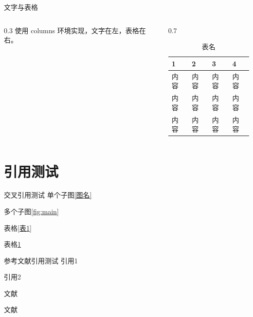 \documentclass[11pt, aspectratio=169, UTF8, fontset=none]{ctexbeamer}
\begin{document}
\begin{frame}{文字与表格}
    \begin{columns}
        \begin{column}{0.3\textwidth}
            使用 columns 环境实现，文字在左，表格在右。
        \end{column}

        \begin{column}{0.7\textwidth}
            \begin{table}[htbp]%
                \caption{表名}\label{表2}
                \centering
                \begin{tabular}{p{1.5cm}<{\centering} p{1.5cm}<{\centering} p{1.5cm}<{\centering} p{1.5cm}<{\centering}}%
                    \toprule[1.5pt]
                    1  & 2  & 3  & 4  \\
                    \midrule[0.75pt]
                    内容 & 内容 & 内容 & 内容 \\
                    内容 & 内容 & 内容 & 内容 \\
                    内容 & 内容 & 内容 & 内容 \\
                    \bottomrule[1pt]
                \end{tabular}
            \end{table}
        \end{column}
    \end{columns}
\end{frame}

\section{引用测试}

\begin{frame}{交叉引用测试}
    单个子图\ref{图名}

    多个子图\ref{fig:main}

    表格\ref{表1}

    表格\ref{表2}
\end{frame}

\begin{frame}{参考文献引用测试}
    引用1\cite{ref1}

    引用2\cite{ref2}

    文献\parencite{ref1}

    文献\parencite{ref2}
\end{frame}
\end{document}

